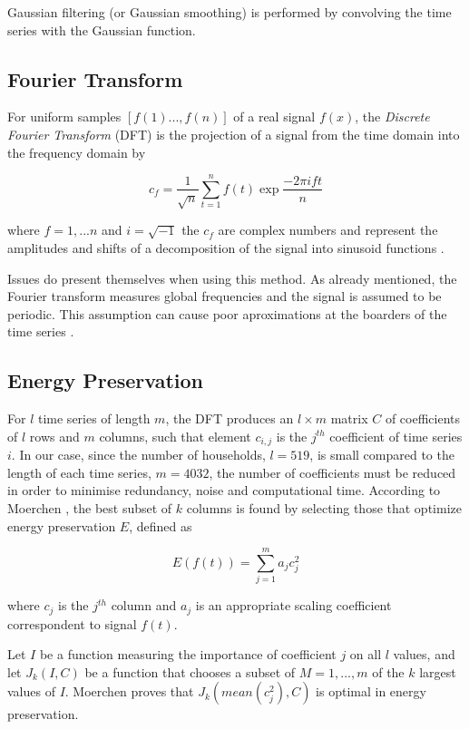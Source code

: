 Gaussian filtering (or Gaussian smoothing) is performed by convolving the time series with the Gaussian function.




\subsection*{Fourier Transform}

For uniform samples $[f(1)...,f(n)]$ of a real signal $f(x)$, the \textit{Discrete Fourier Transform} (DFT) is the projection of a signal from the time domain into the frequency domain by

\[c_f=\frac{1}{\sqrt{n}}\sum_{t=1}^nf(t)\exp{\frac{-2\pi ift}{n}}\]

where $f=1,...n$ and $i=\sqrt{-1}$ the $c_f$ are complex numbers and represent
the amplitudes and shifts of a decomposition of the signal into sinusoid functions \cite{Moerchen}.


Issues do present themselves when using this method. As already mentioned, the Fourier transform measures global frequencies and the signal is assumed to be periodic. This assumption can cause poor aproximations at the boarders of the time series \cite{Moerchen}.

\subsection*{Energy Preservation}

For $l$ time series of length $m$, the DFT produces an $l \times m$ matrix $C $ of coefficients of $l$ rows and $m$ columns, such that element $c_{i,j}$ is the $j^{th}$ coefficient of time series $i$. In our case, since the number of households, $l=519$, is small compared to the length of each time series, $m=4032$, the number of coefficients must be reduced in order to minimise redundancy, noise and computational time. According to Moerchen \cite{Moerchen}, the best subset of $k$ columns is found by selecting those that optimize energy preservation $E$, defined as

\[E(f(t))=\sum_{j=1}^ma_jc^2_j\] 

where $c_j$ is the $j^{th}$ column and $a_j$ is an appropriate scaling coefficient correspondent to signal $f(t)$. 

Let $I$ be a function measuring the importance of coefficient $j$ on all $l$ values, and let $J_k(I,C)$ be a function that chooses a subset of $M = {1, ..., m}$ of the $k$ largest values of $I$. Moerchen \cite{Moerchen} proves that $J_k(mean(c_j^2),C)$ is optimal in energy preservation.

